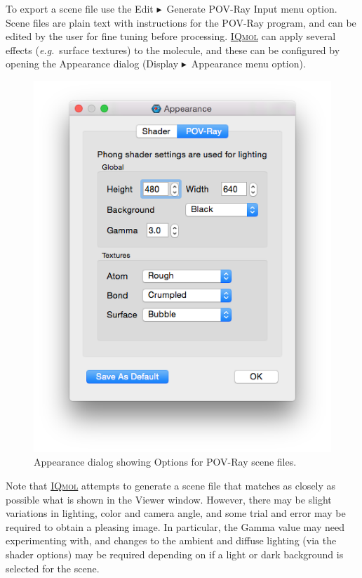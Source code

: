 \documentclass[a4paper,12pt]{article}
\newcommand{\iqmol}{\href{https://www.iqmol.org}{{\scshape IQmol}}}
\newcommand{\bt}{\ensuremath{\blacktriangleright}}
\newcommand{\eg}{\emph{e.g.}}
\begin{document}
To export a scene file use the Edit \bt\ Generate POV-Ray Input menu option.
Scene files are plain text with instructions for the POV-Ray program, and can
be edited by the user for fine tuning before processing.  \iqmol{} can apply
several effects (\eg\ surface textures) to the molecule, and these can be
configured by opening the Appearance dialog (Display \bt\ Appearance menu
option).

\begin{figure}[h]
\begin{center}
\includegraphics[scale=0.20]{figures/POVRayDialog.png}
\caption{Appearance dialog showing Options for POV-Ray scene files.}
\end{center}
\end{figure}

Note that \iqmol{} attempts to generate a scene file that matches as closely as
possible what is shown in the Viewer window.  However, there may be slight
variations in lighting, color and camera angle, and some trial and error may be
required to obtain a pleasing image.  In particular, the Gamma value may need
experimenting with, and changes to the ambient and diffuse lighting (via the
shader options) may be required depending on if a light or dark background is
selected for the scene.
\end{document}
